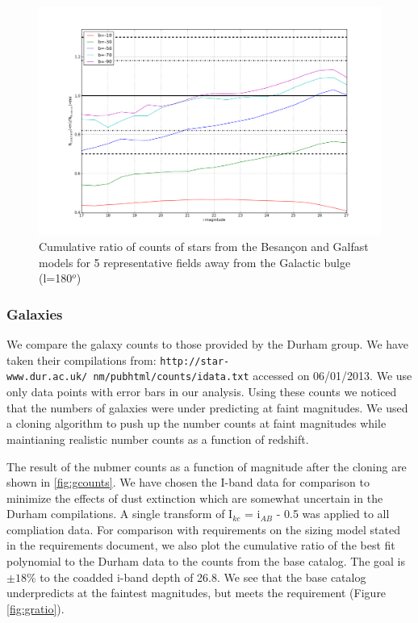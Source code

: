 \documentclass[]{article}
\begin{document}
\begin{figure}
\centering
\includegraphics[width=5in]{validation_figures/cumulative_ratio_stars_180_besancon_dust.png}
\caption{Cumulative ratio of counts of stars from the Besan\c{c}on and Galfast models for 5 representative fields away from the Galactic bulge (l=180$^o$) \label{fig:sratio_180}}
\end{figure}

\subsubsection{Galaxies \label{sec:galaxycounts}}
We compare the galaxy counts to those provided by the Durham group.  We have taken their compilations from:
{\tt http://star-www.dur.ac.uk/~nm/pubhtml/counts/idata.txt} accessed on 06/01/2013.  We use only data points with error bars in our analysis.  Using these counts
we noticed that the numbers of galaxies were under predicting at faint magnitudes.  We used a cloning algorithm to push up the number counts at faint magnitudes
while maintianing realistic number counts as a function of redshift.

The result of the nubmer counts as a function of magnitude after the cloning are shown in \ref{fig:gcounts}.  We have chosen the I-band data for comparison to 
minimize the effects of dust extinction which are somewhat uncertain in the Durham compilations.  A single transform of I$_{kc}$ = i$_{AB}$ - 0.5 was applied to
all compliation data.  For comparison with requirements on the sizing model stated in the requirements document, we also plot the cumulative ratio of the best fit polynomial
to the Durham data to the counts from the base catalog.  The goal is $\pm18\%$ to the coadded i-band depth of 26.8.  We see that the base catalog
underpredicts at the faintest magnitudes, but meets the requirement (Figure \ref{fig:gratio}).
\end{document}
